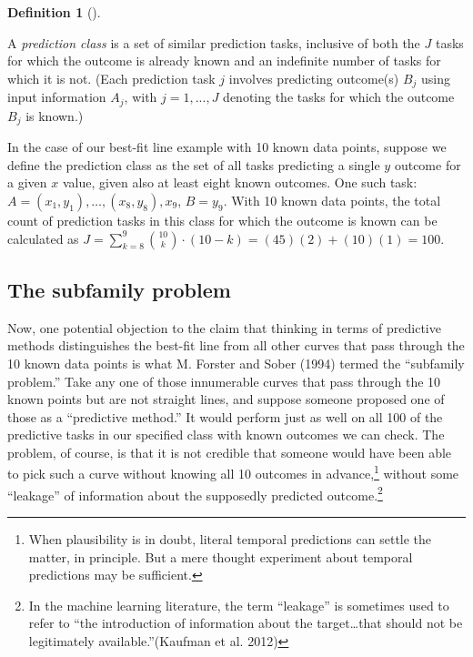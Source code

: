 \documentclass[
  letterpaper,
  DIV=11,
  numbers=noendperiod]{scrartcl}
\theoremstyle{definition}
\newtheorem{definition}{Definition}[section]
\theoremstyle{remark}
\begin{document}
\begin{definition}[]\protect\hypertarget{def-class}{}\label{def-class}

A \emph{prediction class} is a set of similar prediction tasks,
inclusive of both the \(J\) tasks for which the outcome is already known
and an indefinite number of tasks for which it is not. (Each prediction
task \(j\) involves predicting outcome(s) \(B_j\) using input
information \(A_j\), with \(j = 1, ..., J\) denoting the tasks for which
the outcome \(B_j\) is known.)

\end{definition}

In the case of our best-fit line example with 10 known data points,
suppose we define the prediction class as the set of all tasks
predicting a single \(y\) outcome for a given \(x\) value, given also at
least eight known outcomes. One such task:
\(A = {(x_1, y_1), \ldots, (x_8, y_8), x_9}\), \(B = {y_9}\). With 10
known data points, the total count of prediction tasks in this class for
which the outcome is known can be calculated as
\(J = \sum_{k=8}^{9} \binom{10}{k} \cdot (10 - k) = (45)(2) + (10)(1) = 100\).

\subsection{The subfamily problem}\label{the-subfamily-problem}

Now, one potential objection to the claim that thinking in terms of
predictive methods distinguishes the best-fit line from all other curves
that pass through the 10 known data points is what M. Forster and Sober
(1994) termed the ``subfamily problem.'' Take any one of those
innumerable curves that pass through the 10 known points but are not
straight lines, and suppose someone proposed one of those as a
``predictive method.'' It would perform just as well on all 100 of the
predictive tasks in our specified class with known outcomes we can
check. The problem, of course, is that it is not credible that someone
would have been able to pick such a curve without knowing all 10
outcomes in advance,\footnote{When plausibility is in doubt, literal
  temporal predictions can settle the matter, in principle. But a mere
  thought experiment about temporal predictions may be sufficient.}
without some ``leakage'' of information about the supposedly predicted
outcome.\footnote{In the machine learning literature, the term
  ``leakage'' is sometimes used to refer to ``the introduction of
  information about the target\ldots that should not be legitimately
  available.''(Kaufman et al. 2012)}
\end{document}
